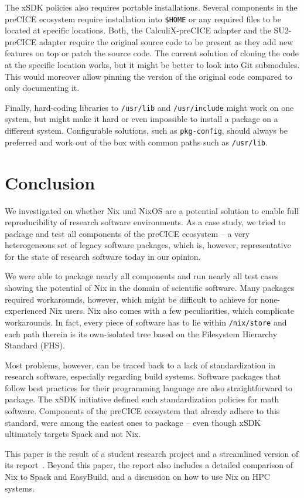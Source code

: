 \documentclass{eceasst}
\begin{document}
The xSDK policies also requires portable installations. Several components in the preCICE ecosystem require installation into \texttt{\$HOME} or any required files to be located at specific locations. Both, the CalculiX-preCICE adapter and the SU2-preCICE adapter require the original source code to be present as they add new features on top or patch the source code.
The current solution of cloning the code at the specific location works, but it might be better to look into Git submodules. This would moreover allow pinning the version of the original code compared to only documenting it.

Finally, hard-coding libraries to \texttt{/usr/lib} and \texttt{/usr/include} might work on one system, but might make it hard or even impossible to install a package on a different system.
Configurable solutions, such as \texttt{pkg-config}, should always be preferred and work out of the box with common paths such as \texttt{/usr/lib}.

\section{Conclusion}

We investigated on whether Nix und NixOS are a potential solution to enable full reproducibility of research software environments. As a case study, we tried to package and test all components of the preCICE ecosystem -- a very heterogeneous set of legacy software packages, which is, however, representative for the state of research software today in our opinion.

We were able to package nearly all components and run nearly all test cases showing the potential of Nix in the domain of scientific software. Many packages required workarounds, however, which might be difficult to achieve for none-experienced Nix users. 
Nix also comes with a few peculiarities, which complicate workarounds.
In fact, every piece of software has to lie within \texttt{/nix/store} and each path therein is its own-isolated tree based on the Filesystem Hierarchy Standard (FHS).

Most problems, however, can be traced back to a lack of standardization in research software, especially regarding build systems. 
Software packages that follow best practices for their programming language are also straightforward to package.
The xSDK initiative defined such standardization policies for math software. Components of the preCICE ecosystem that already adhere to this standard, were among the easiest ones to package -- even though xSDK  ultimately targets Spack and not Nix.

This paper is the result of a student research project and a streamlined version of its report~\cite{studentreport}. Beyond this paper, the report also includes a detailed comparison of Nix to Spack and EasyBuild, and a discussion on how to use Nix on HPC systems. 





\end{document}
